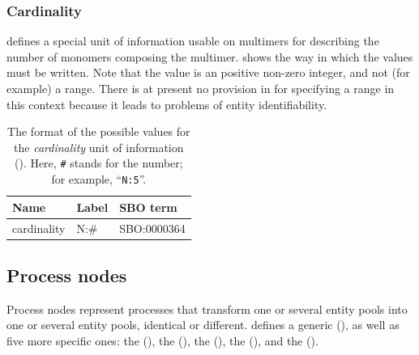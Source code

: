 \subsubsection{Cardinality}
\label{sec:cardinality-cv}

\SBGNPDLone defines a special unit of information usable on multimers for describing the number of monomers composing the multimer.   shows the way in which the values must be written.  Note that the value is an positive non-zero integer, and not (for example) a range.  There is at present no provision in \SBGNPDLone for specifying a range in this context because it leads to problems of entity identifiability.

\begin{table}[h]
  \centering
  \begin{tabular}{l>{\ttfamily}l>{\ttfamily}l}
    \toprule
    \textbf{Name}   & \textbf{\rmfamily Label} & \textbf{\rmfamily SBO term} \\
    \midrule
    cardinality    & N:\#  & SBO:0000364\\
    \bottomrule
  \end{tabular}
  \caption{The format of the possible values for the
    \emph{cardinality} unit of information
    ().  Here, \texttt{\#} stands for the
    number; for example, ``\texttt{N:5}''.}
  \label{tab:cardinality-cv}
\end{table}



\subsection{Process nodes}\label{sec:PNs}

Process nodes represent processes that transform one or several entity pools into one or several entity pools, identical or different.  \SBGNPDLone defines a generic  (), as well as five more specific ones: the  (), the  (), the  (), the  (), and the  ().

